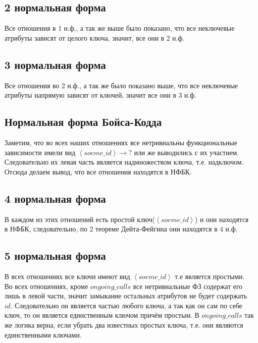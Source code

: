 \documentclass[fontsize=12pt]{article}
\begin{document}
\subsection*{2 нормальная форма}

Все отношения в 1 н.ф., а так же выше было показано, что все неключевые атрибуты зависят от целого ключа, значит, все они в 2 н.ф.

\subsection*{3 нормальная форма}

Все отношения во 2 н.ф., а так же было показано выше, что все неключевые атрибуты напрямую зависят от ключей, значит все они в 3 н.ф.

\subsection*{Нормальная форма Бойса-Кодда}

Заметим, что во всех наших отношениях все нетривиальны функциональные зависимости имели вид $\left< soeme\_id \right> \rightarrow ?$ или же выводились с их участием. Следовательно их левая часть является надмножеством ключа, т.е. надключом. Отсюда делаем вывод, что все отношения находятся в НФБК.

\subsection*{4 нормальная форма}

В каждом из этих отношений есть простой ключ($\left< soeme\_id \right>$) и они находятся в НФБК, следовательно, по 2 теореме Дейта-Фейгина они находятся в 4 н.ф.

\subsection*{5 нормальная форма}

В всех отношениях все ключи имеют вид $\left< soeme\_id \right>$ т.е является простыми. Во всех отношениях, кроме $ongoing\_calls$ все нетривиальные ФЗ содержат его лишь в левой части, значит замыкание остальных атрибутов не будет содержать $id$. Следовательно он является частью любого ключа, а так как он сам по себе ключ, то он является единственным ключом причём простым. В $ongoing\_calls$ так же логика верна, если убрать два известных простых ключа, т.е. они являются единственными ключами.
\end{document}
